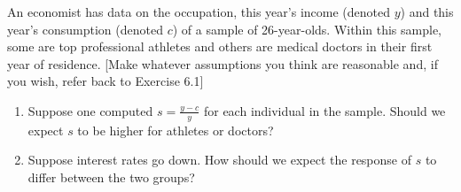 \noindent An economist has data on the occupation, this year's income (denoted $y$) and this year's consumption (denoted $c$) of a sample
of 26-year-olds. Within this sample, some are top professional athletes and others are medical doctors in their first year of
residence. [Make whatever assumptions you think are reasonable and, if you wish, refer back to Exercise 6.1]
\begin{enumerate}[label=(\alph*),leftmargin=2.2em,topsep=2pt,itemsep=1pt]
\item Suppose one computed $s=\frac{y-c}{y}$ for each individual in the sample. Should we expect $s$ to be higher for athletes or doctors?
\item Suppose interest rates go down. How should we expect the response of $s$ to differ between the two groups?
\end{enumerate}
\resolespaco
